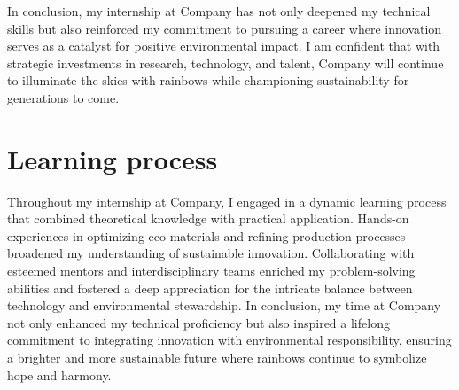 In conclusion, my internship at Company has not only deepened my technical skills but also reinforced my commitment to pursuing a career where innovation serves as a catalyst for positive environmental impact. I am confident that with strategic investments in research, technology, and talent, Company will continue to illuminate the skies with rainbows while championing sustainability for generations to come.

\section{Learning process}

Throughout my internship at Company, I engaged in a dynamic learning process that combined theoretical knowledge with practical application. Hands-on experiences in optimizing eco-materials and refining production processes broadened my understanding of sustainable innovation. Collaborating with esteemed mentors and interdisciplinary teams enriched my problem-solving abilities and fostered a deep appreciation for the intricate balance between technology and environmental stewardship. In conclusion, my time at Company not only enhanced my technical proficiency but also inspired a lifelong commitment to integrating innovation with environmental responsibility, ensuring a brighter and more sustainable future where rainbows continue to symbolize hope and harmony.